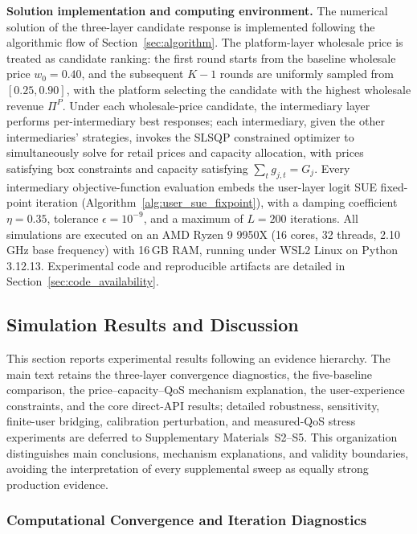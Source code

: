 \documentclass[11pt,a4paper]{article}
\begin{document}
\textbf{Solution implementation and computing environment.} The numerical solution of the three-layer candidate response is implemented following the algorithmic flow of Section~\ref{sec:algorithm}. The platform-layer wholesale price is treated as candidate ranking: the first round starts from the baseline wholesale price $w_0=0.40$, and the subsequent $K-1$ rounds are uniformly sampled from $[0.25,0.90]$, with the platform selecting the candidate with the highest wholesale revenue $\Pi^P$. Under each wholesale-price candidate, the intermediary layer performs per-intermediary best responses; each intermediary, given the other intermediaries' strategies, invokes the SLSQP constrained optimizer to simultaneously solve for retail prices and capacity allocation, with prices satisfying box constraints and capacity satisfying $\sum_t g_{j,t}=G_j$. Every intermediary objective-function evaluation embeds the user-layer logit SUE fixed-point iteration (Algorithm~\ref{alg:user_sue_fixpoint}), with a damping coefficient $\eta=0.35$, tolerance $\epsilon=10^{-9}$, and a maximum of $L=200$ iterations. All simulations are executed on an AMD Ryzen 9 9950X (16 cores, 32 threads, 2.10\,GHz base frequency) with 16\,GB RAM, running under WSL2 Linux on Python 3.12.13. Experimental code and reproducible artifacts are detailed in Section~\ref{sec:code_availability}.

\subsection{Simulation Results and Discussion}
\label{sec:simulation_results}

This section reports experimental results following an evidence hierarchy. The main text retains the three-layer convergence diagnostics, the five-baseline comparison, the price--capacity--QoS mechanism explanation, the user-experience constraints, and the core direct-API results; detailed robustness, sensitivity, finite-user bridging, calibration perturbation, and measured-QoS stress experiments are deferred to Supplementary Materials~S2--S5. This organization distinguishes main conclusions, mechanism explanations, and validity boundaries, avoiding the interpretation of every supplemental sweep as equally strong production evidence.

\subsubsection{Computational Convergence and Iteration Diagnostics}
\label{sec:calculation_convergence}
\end{document}
